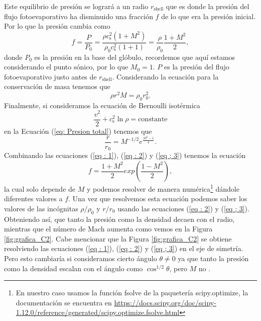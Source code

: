 \documentclass{book}
\begin{document}
Este equilibrio de presión se logrará a un radio $r_\mathrm{shell}$ que es donde la presión del flujo fotoevaporativo ha disminuido una fracción $f$ de lo que era la presión inicial. Por lo que la presión cambia como 
\begin{equation}\label{eq : 1}
f=\frac{P}{P_0}=\frac{\rho c_\mathrm{s}^2(1+M^2)}{\rho_0 c_\mathrm{s}^2(1+1)}=\frac{\rho}{\rho_0}\frac{1+M^2}{2},
\end{equation}
donde $P_0$ es la presión en la base del glóbulo, recordemos que aquí estamos considerando el punto sónico, por lo que  $M_0=1$. $P$ es la presión del flujo fotoevaporativo justo antes de $r_\mathrm{shell}$.
Considerando la ecuación para la conservación de masa tenemos que
\begin{equation}\label{eq : 2}
\rho r^2M	=\rho_0 r_0^2.
\end{equation}
Finalmente, si consideramos la ecuación de Bernoulli isotérmica 
\begin{equation}
\frac{v^2}{2}+c_\mathrm{s}^2\ln\rho=\text{constante}
\end{equation}
en la Ecuación (\ref{eq: Presion total}) tenemos que \citep{Dyson:1968}
\begin{equation}\label{eq ; 3} \frac{r}{r_0}=M^{-1/2}e^{\frac{M^2-1}{4}}.
\end{equation}
Combinando las ecuaciones (\ref{eq : 1}), (\ref{eq : 2}) y (\ref{eq ; 3})   tenemos la ecuación
\begin{equation}
    f=\frac{1+M^2}{2}exp\left(\frac{1-M^2}{2}\right),
\end{equation}
la cual solo depende de $M$ y podemos resolver de manera numérica\footnote{En nuestro caso usamos la función fsolve de la paquetería scipy.optimize, la documentación se encuentra en \url{https://docs.scipy.org/doc/scipy-1.12.0/reference/generated/scipy.optimize.fsolve.html}} dándole diferentes valores a $f$. Una vez que resolvemos esta ecuación podemos saber los valores de las incógnitas  $\rho/\rho_0$ y $r/r_0$ usando las ecuaciones (\ref{eq : 2}) y (\ref{eq ; 3}). Obteniendo así, que tanto la presión como la densidad decaen con el radio, mientras que el número de Mach aumenta como vemos en la Figura \ref{fig:grafica_C2}. Cabe mencionar que la Figura \ref{fig:grafica_C2} se obtiene resolviendo las ecuaciones (\ref{eq : 1}), (\ref{eq : 2}) y (\ref{eq ; 3}) en el eje de simetría. Pero esto cambiaría si consideramos cierto ángulo $\theta\neq 0 $ ya que tanto la presión como la densidad escalan con el ángulo como $\cos^{1/2}\theta$, pero $M$ no \citep{Tarango:2018}.
\end{document}
